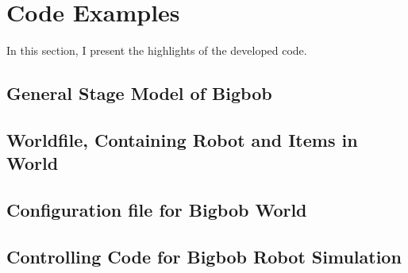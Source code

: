 \documentclass[a4paper]{report}
\begin{document}
\appendix
\chapter{Code Examples}
In this section, I present the highlights of the developed code.  

\section{General Stage Model of Bigbob}\label{app:Abigbob.inc}


\section{Worldfile, Containing Robot and Items in World}\label{app:Brobotsjunkworld}


\section{Configuration file for Bigbob World}\label{app:Cconfig}


\section{Controlling Code for Bigbob Robot Simulation}\label{app:Dbigbobcode}

\end{document}
